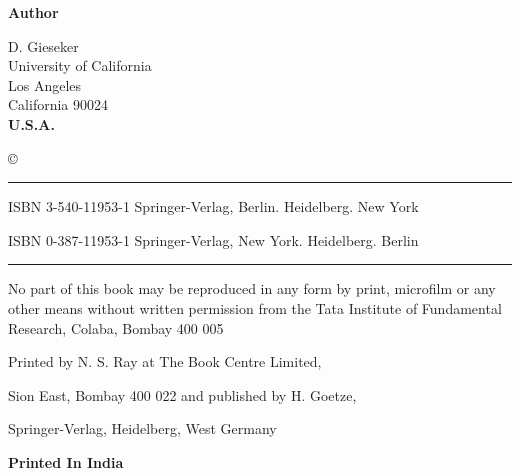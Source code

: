 \thispagestyle{empty}
\begin{center}
{\bf Author}\\
\medskip

{\large D. Gieseker}\\
University of California\\
Los Angeles\\
California 90024\\
{\bf U.S.A.}
\vfill

\copyright {}
\vfill

\noindent
\rule{\textwidth}{0.7pt}

ISBN 3-540-11953-1 Springer-Verlag, Berlin. Heidelberg. New York
\medskip

ISBN 0-387-11953-1 Springer-Verlag, New York. Heidelberg. Berlin

\noindent
\rule{\textwidth}{0.7pt}
\vfill


\parbox{0.7\textwidth}{No part of this book may be reproduced in any form
by print, microfilm or any other means without
written permission from the Tata Institute of 
Fundamental Research, Colaba, Bombay 400 005}

\vfill

Printed by N. S. Ray at The Book Centre Limited,

Sion East, Bombay 400 022 and published by H. Goetze,

Springer-Verlag, Heidelberg, West Germany
\vfill

{\bf Printed In India}

\end{center}

